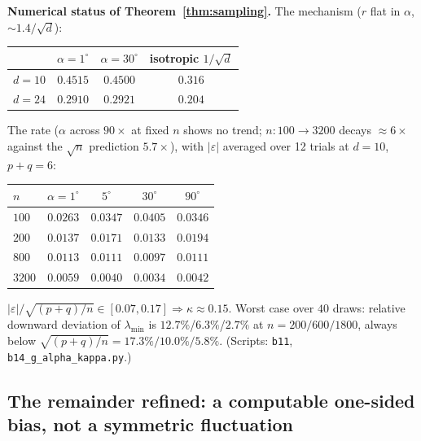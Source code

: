 \documentclass[11pt]{article}
\theoremstyle{remark}
\begin{document}
\noindent\textbf{Numerical status of Theorem~\ref{thm:sampling}.}
The mechanism ($r$ flat in $\alpha$, $\sim1.4/\sqrt d$):
\begin{center}\begin{tabular}{lccc}
\toprule & $\alpha=1^\circ$ & $\alpha=30^\circ$ & isotropic $1/\sqrt d$\\
\midrule
$d=10$ & $0.4515$ & $0.4500$ & $0.316$\\
$d=24$ & $0.2910$ & $0.2921$ & $0.204$\\
\bottomrule
\end{tabular}\end{center}
The rate ($\alpha$ across $90\times$ at fixed $n$ shows no trend; $n:100\to3200$ decays
$\approx6\times$ against the $\sqrt n$ prediction $5.7\times$), with $|\varepsilon|$
averaged over 12 trials at $d=10$, $p+q=6$:
\begin{center}\begin{tabular}{lcccc}
\toprule $n$ & $\alpha=1^\circ$ & $5^\circ$ & $30^\circ$ & $90^\circ$\\
\midrule
$100$  & $0.0263$ & $0.0347$ & $0.0405$ & $0.0346$\\
$200$  & $0.0137$ & $0.0171$ & $0.0133$ & $0.0194$\\
$800$  & $0.0113$ & $0.0111$ & $0.0097$ & $0.0111$\\
$3200$ & $0.0059$ & $0.0040$ & $0.0034$ & $0.0042$\\
\bottomrule
\end{tabular}\end{center}
$|\varepsilon|/\sqrt{(p+q)/n}\in[0.07,0.17]\Rightarrow\kappa\approx0.15$. Worst case over
$40$ draws: relative downward deviation of $\lambda_{\min}$ is $12.7\%$/$6.3\%$/$2.7\%$
at $n=200/600/1800$, always below $\sqrt{(p+q)/n}=17.3\%/10.0\%/5.8\%$.
(Scripts: \texttt{b11}, \texttt{b14\_g\_alpha\_kappa.py}.)

\subsection{The remainder refined: a computable one-sided bias, not a symmetric fluctuation}
\label{sec:bias}
\end{document}
